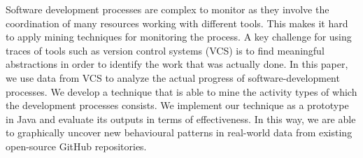 %
	
Software development processes are complex to monitor as they involve the coordination of many resources working with different tools.
This makes it hard to apply mining techniques for monitoring the process. 
A key challenge for using traces of tools such as version control systems (VCS) is to find meaningful abstractions in order to identify the work that was actually done. 
In this paper, we use data from VCS to analyze the actual progress of software-development processes. We develop a technique that is able to mine the activity types of which the development processes consists. 
We implement our technique as a prototype in Java and evaluate its outputs in terms of effectiveness.
In this way, we are able to graphically uncover new behavioural patterns in real-world data from existing open-source GitHub repositories.




